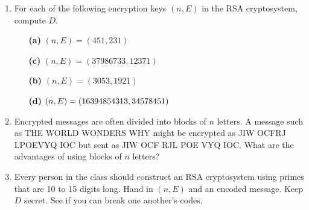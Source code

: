 {\begin{enumerate}
 
 
\bf\item\rm
For each of the following encryption keys $(n, E)$ in the RSA
cryptosystem, compute $D$.
 
\vspace{3pt}        %
 
\hspace{-7pt}
\begin{minipage}[t]{4.6in}
\noindent
\begin{minipage}[t]{2.25in}
\begin{itemize}
 
 \item[{\bf (a)}]
$(n, E) = (451, 231)$
 
 \item[{\bf (c)}]
$(n, E) = (37986733, 12371)$
 
\end{itemize}
\end{minipage} \hfill
\begin{minipage}[t]{2.25in}
\begin{itemize}
 
 \item[{\bf (b)}]
$(n, E) = (3053, 1921)$
 
 \item[{\bf (d)}]
$(n, E) =\\ (16394854313, 34578451)$
 
\end{itemize}
\end{minipage}
\end{minipage}
 
\vspace{2pt}        %
 
 
 
 
\bf\item\rm
Encrypted messages are often divided into blocks of $n$ letters. A
message such as THE WORLD WONDERS WHY might be encrypted as 
JIW OCFRJ LPOEVYQ IOC but sent as JIW OCF RJL POE VYQ
IOC.  What are the advantages of using blocks of $n$ letters? 
 
 
 
 
\bf\item\rm
Every person in the class should construct an RSA cryptosystem using primes
that are 10 to 15 digits long.  Hand in $(n, E)$ and an encoded 
message. Keep $D$ secret. See if you can break one another's codes.
 
 
\end{enumerate}
}
 
